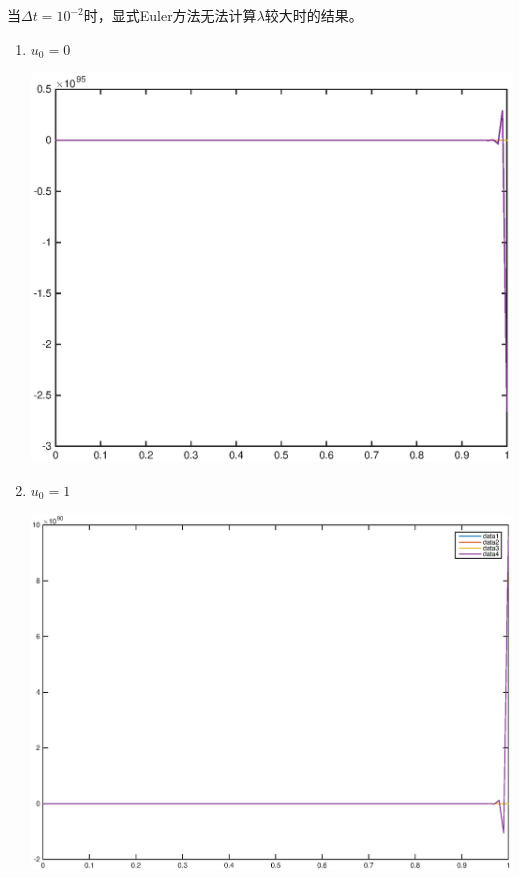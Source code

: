 \documentclass{ctexart}
\begin{document}
\begin{enumerate}
\begin{enumerate}
当\(\Delta t = 10^{-2}\)时，显式Euler方法无法计算\(\lambda\)较大时的结果。

\begin{enumerate}

\item  \(u_0=0\)

\centerline{\includegraphics[width=5.5in]{X011.eps}}

\item  \(u_0=1\)

\centerline{\includegraphics[width=5.5in]{X01.eps}}

\end{enumerate}



\end{enumerate}
\end{enumerate}
\end{document}
